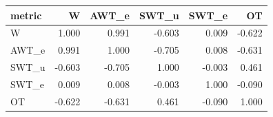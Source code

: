 \begin{tabular}{lrrrrr}
\toprule
metric & W & AWT_e & SWT_u & SWT_e & OT \\
\midrule
W & 1.000 & 0.991 & -0.603 & 0.009 & -0.622 \\
AWT_e & 0.991 & 1.000 & -0.705 & 0.008 & -0.631 \\
SWT_u & -0.603 & -0.705 & 1.000 & -0.003 & 0.461 \\
SWT_e & 0.009 & 0.008 & -0.003 & 1.000 & -0.090 \\
OT & -0.622 & -0.631 & 0.461 & -0.090 & 1.000 \\
\bottomrule
\end{tabular}
